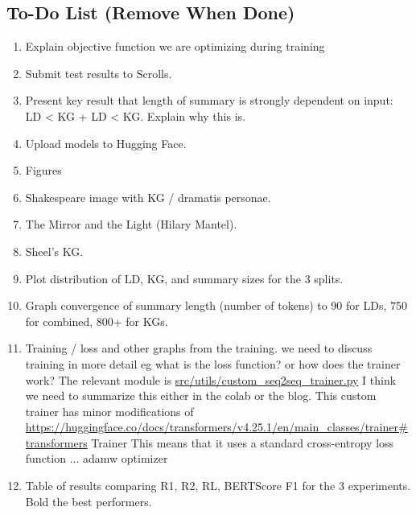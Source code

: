 \documentclass[12pt]{article}
\begin{document}

\subsection*{To-Do List (Remove When Done)}
\begin{enumerate}
\item Explain objective function we are optimizing during training


\item Submit test results to Scrolls.




\item Present key result that length of summary is strongly dependent on input: LD < KG + LD < KG. Explain why this is.


\item Upload models to Hugging Face.


\item Figures


\item Shakespeare image with KG / dramatis personae.


\item The Mirror and the Light (Hilary Mantel).


\item Sheel's KG.


\item Plot distribution of LD, KG, and summary sizes for the 3 splits.


\item Graph convergence of summary length (number of tokens) to 90 for LDs, 750 for combined, 800+ for KGs.


\item Training / loss and other graphs from the training.
 we need to discuss training in more detail eg what is the loss function? or
 how does the trainer work? The relevant module is
\url{src/utils/custom_seq2seq_trainer.py}
I think we need to summarize this either in the colab or the blog. This custom
trainer has minor modifications of
\url{https://huggingface.co/docs/transformers/v4.25.1/en/main_classes/trainer#transformers}
Trainer This means that it uses a standard cross-entropy loss function ... adamw optimizer


\item Table of results comparing R1, R2, RL, BERTScore F1 for the 3 experiments. Bold the best performers.
\end{enumerate}
\end{document}
